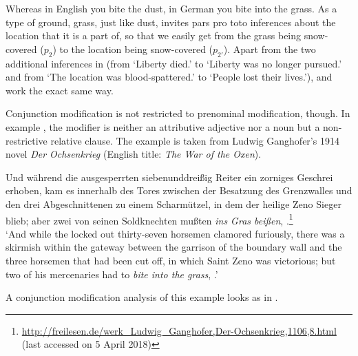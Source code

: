 \documentclass[output=paper]{langsci/langscibook}
\begin{document}
\noindent Whereas in English you bite the dust, in German you bite into the grass. As a type of ground, grass, just like dust, invites pars pro toto inferences about the location that it is a part of, so that we easily get from the grass being snow-covered ($p_{2}$) to the location being snow-covered ($p_{2'}$). Apart from the two additional inferences in  (from `Liberty died.' to `Liberty was no longer pursued.' and from `The location was blood-spattered.' to `People lost their lives.'),  and  work the exact same way.

Conjunction modification is not restricted to prenominal modification, though. In example , the modifier is neither an attributive adjective nor a noun but a non-restrictive relative clause. The example is taken from Ludwig Ganghofer's 1914 novel \textit{Der Ochsenkrieg} (English title: \textit{The War of the Oxen}).

\ea \label{hardly visible grass}
Und während die ausgesperrten siebenunddreißig Reiter ein zorniges Ge\-schrei erhoben, kam es innerhalb des Tores zwischen der Besatzung des Grenzwalles und den drei Abgeschnittenen zu einem Scharmützel, in dem der heilige Zeno Sieger blieb; aber zwei von seinen Soldknechten mußten \textit{ins Gras beißen}, \underline{}.\footnote{\url{http://freilesen.de/werk_Ludwig_Ganghofer,Der-Ochsenkrieg,1106,8.html}
(last accessed on 5 April 2018)}\\
\glt `And while the locked out thirty-seven horsemen clamored furiously, there was a skirmish within the gateway between the garrison of the boundary wall and the three horsemen that had been cut off, in which Saint Zeno was victorious; but two of his mercenaries had to \textit{bite into the grass}, \underline{}.'
\z

\noindent A conjunction modification analysis of this example looks as in .
\end{document}
